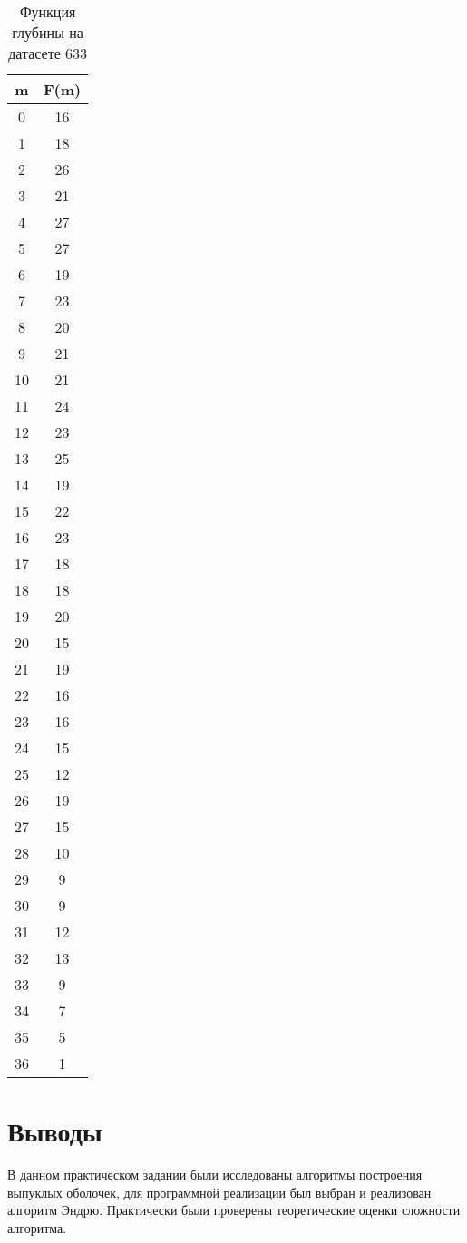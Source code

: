 \documentclass[twoside]{article}
\begin{document}
\begin{table}[]
	\centering
	\caption{Функция глубины на датасете 633}
	\label{my-label}
	\begin{tabular}{|c|c|}
		\hline
		\textbf{m} & \textbf{F(m)} \\ \hline
		0          & 16            \\
		1          & 18            \\
		2          & 26            \\
		3          & 21            \\
		4          & 27            \\
		5          & 27            \\
		6          & 19            \\
		7          & 23            \\
		8          & 20            \\
		9          & 21            \\
		10         & 21            \\
		11         & 24            \\
		12         & 23            \\
		13         & 25            \\
		14         & 19            \\
		15         & 22            \\
		16         & 23            \\
		17         & 18            \\
		18         & 18            \\
		19         & 20            \\
		20         & 15            \\
		21         & 19            \\
		22         & 16            \\
		23         & 16            \\
		24         & 15            \\
		25         & 12            \\
		26         & 19            \\
		27         & 15            \\
		28         & 10            \\
		29         & 9             \\
		30         & 9             \\
		31         & 12            \\
		32         & 13            \\
		33         & 9             \\
		34         & 7             \\
		35         & 5             \\
		36         & 1             \\\hline
	\end{tabular}
\end{table}

\section{Выводы}
В данном практическом задании были исследованы алгоритмы построения выпуклых оболочек, для программной реализации был выбран и реализован алгоритм Эндрю. Практически были проверены теоретические оценки сложности алгоритма. 
\end{document}
